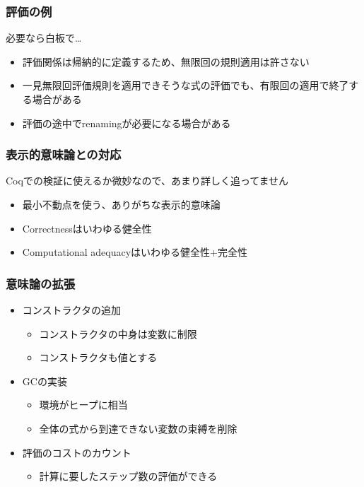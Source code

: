 \documentclass[dvipdfmx,cjk,xcolor=dvipsnames,envcountsect,notheorems,12pt]{beamer}
\theoremstyle{definition}
\begin{document}
\begin{frame}
	\frametitle{評価の例}
	\LARGE \begin{center}
		必要なら白板で…
		\vfill
	\end{center}

	\begin{itemize}
		\item 評価関係は帰納的に定義するため、無限回の規則適用は許さない
		\item 一見無限回評価規則を適用できそうな式の評価でも、有限回の適用で終了する場合がある
		\item 評価の途中でrenamingが必要になる場合がある
	\end{itemize}
\end{frame}

\begin{frame}
	\frametitle{表示的意味論との対応}
	\begin{center}
		Coqでの検証に使えるか微妙なので、あまり詳しく追ってません
	\end{center}
	\begin{itemize}
		\item 最小不動点を使う、ありがちな\mbox{表示的意味論}
		\item Correctnessはいわゆる健全性
		\item Computational adequacyはいわゆる健全性+完全性
	\end{itemize}
\end{frame}

\begin{frame}
	\frametitle{意味論の拡張}
	\begin{itemize}
		\item コンストラクタの追加
			\begin{itemize}
				\item コンストラクタの中身は変数に制限
				\item コンストラクタも値とする
			\end{itemize}
		\item GCの実装
			\begin{itemize}
				\item 環境がヒープに相当
				\item 全体の式から到達できない変数の束縛を削除
			\end{itemize}
		\item 評価のコストのカウント
			\begin{itemize}
				\item 計算に要したステップ数の評価ができる
			\end{itemize}
	\end{itemize}
\end{frame}
\end{document}
